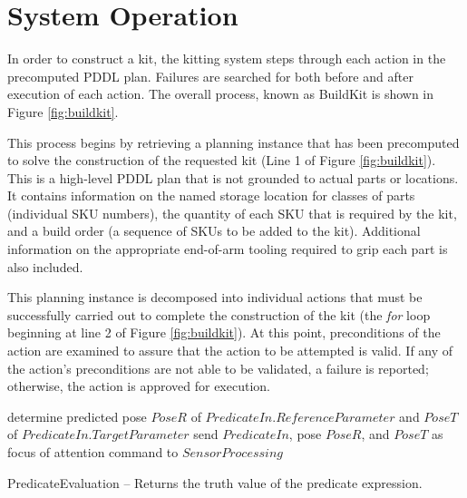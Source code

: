 \section{System Operation}
\label{sect:operation}
In order to construct a kit, the kitting system steps through each action in
the precomputed PDDL plan. Failures are searched for both before and after execution of 
each action. The overall process, known as {\sc BuildKit} is shown in Figure
\ref{fig:buildkit}. 

This process begins by retrieving a planning instance that has been 
precomputed to solve the construction of the requested kit (Line 1 of 
Figure \ref{fig:buildkit}). This is a high-level PDDL
plan that is not grounded to actual parts or locations. It contains information
on the named storage location for classes of parts (individual SKU numbers), 
the quantity of each SKU that is required by the kit, and a build order (a sequence
of SKUs to be added to the kit). Additional information on the appropriate
end-of-arm tooling required to grip each part is also included.

This planning instance is decomposed into individual actions that must
be successfully carried out to complete the construction of the kit (the
{\it for} loop beginning at line 2 of Figure \ref{fig:buildkit}). At this point,
preconditions of the action are examined to assure that the action to be attempted
is valid. If any of the action's preconditions are not able to be validated,
a failure is reported; otherwise, the action is approved for execution.
%
\begin{algorithm}[h!]
 	determine predicted pose $PoseR$ of $PredicateIn.ReferenceParameter$
 	and $PoseT$ of $PredicateIn.TargetParameter$ \;
 	send $PredicateIn$, pose $PoseR$, and $PoseT$ as focus of attention command to $SensorProcessing$\;
\caption{{\sc PredicateEvaluation} -- Returns the truth value of the predicate expression.}
\label{fig:predicateEval}
\end{algorithm}
%
